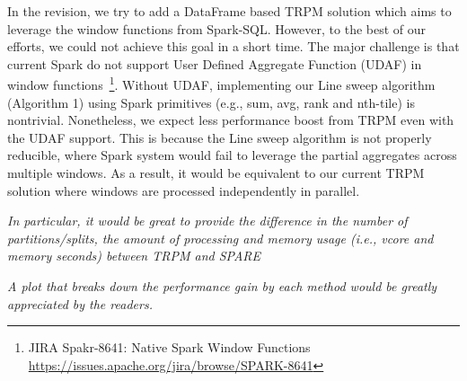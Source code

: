 {In the revision, we try to add a DataFrame based TRPM solution 
which aims to leverage the window functions from Spark-SQL.
However, to the best of our efforts, we could not achieve this goal in a short time. 
The major challenge is that current Spark do not support User Defined Aggregate Function (UDAF)
in window functions~\footnote{JIRA Spakr-8641: Native Spark Window Functions \url{https://issues.apache.org/jira/browse/SPARK-8641}}. Without UDAF, implementing
our Line sweep algorithm (Algorithm 1) using Spark primitives (e.g., sum, avg, rank and nth-tile)
is nontrivial. Nonetheless, we expect less performance
boost from TRPM even with the UDAF support. This is because the Line sweep algorithm is not
properly reducible, where Spark system would fail to leverage the partial aggregates
across multiple windows. As a result, it would be equivalent to our current TRPM
solution where windows are processed independently in parallel.
%
%
%
}

\emph{In particular, it would be great to provide the
difference in the number of partitions/splits, the amount of processing and
memory usage (i.e., vcore and memory seconds) between TRPM and SPARE}



\emph{A plot that breaks down the performance gain by each method would
be greatly appreciated by the readers.}

